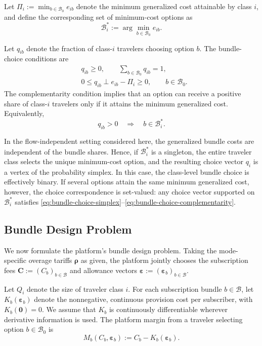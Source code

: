 \documentclass{article}
\begin{document}
Let $\Pi_i:=\min_{b\in\mathcal B_0} e_{ib}$
denote the minimum generalized cost attainable by class $i$, and define the corresponding set of minimum-cost options as
\begin{equation}
\mathcal B_i^*
:=
\arg\min_{b\in\mathcal B_0} e_{ib}.
\label{eq:min-cost-bundle-set}
\end{equation}

Let $q_{ib}$ denote the fraction of class-$i$ travelers choosing option $b$. The bundle-choice conditions are
\begin{align}
&q_{ib}\geq 0,
\qquad
\sum_{b\in\mathcal B_0}q_{ib}=1,
\label{eq:bundle-choice-simplex}\\
&0\leq q_{ib}
\perp
e_{ib}-\Pi_i
\geq0,
\qquad
b\in\mathcal B_0.
\label{eq:bundle-choice-complementarity}
\end{align}
The complementarity condition implies that an option can receive a positive share of class-$i$ travelers only if it attains the minimum generalized cost. Equivalently,
\begin{equation}
q_{ib}>0
\quad\Longrightarrow\quad
b\in\mathcal B_i^*.
\end{equation}

In the flow-independent setting considered here, the generalized bundle costs are independent of the bundle shares. Hence, if $\mathcal B_i^*$ is a singleton, the entire traveler class selects the unique minimum-cost option, and the resulting choice vector $q_i$ is a vertex of the probability simplex. In this case, the class-level bundle choice is effectively binary. If several options attain the same minimum generalized cost, however, the choice correspondence is set-valued: any choice vector supported on $\mathcal B_i^*$ satisfies \eqref{eq:bundle-choice-simplex}--\eqref{eq:bundle-choice-complementarity}. 

\subsection{Bundle Design Problem}

We now formulate the platform's bundle design problem. Taking the
mode-specific overage tariffs $\bm\rho$ as given, the platform jointly
chooses the subscription fees $\bm C:=(C_b)_{b\in\mathcal B}$ and
allowance vectors $\bm\varepsilon:=(\bm\varepsilon_b)_{b\in\mathcal B}$.

Let $Q_i$ denote the size of traveler class $i$. For each subscription
bundle $b\in\mathcal B$, let $K_b(\bm\varepsilon_b)$ denote the nonnegative,
continuous provision cost per subscriber, with $K_b(\bm0)=0$. We assume
that $K_b$ is continuously differentiable wherever derivative information
is used. The platform margin from a traveler selecting option $b\in\mathcal B_0$ is
\begin{equation}
    M_b(C_b,\bm\varepsilon_b)
    :=
    C_b-K_b(\bm\varepsilon_b).
    \label{eq:bundle-margin}
\end{equation}
\end{document}
